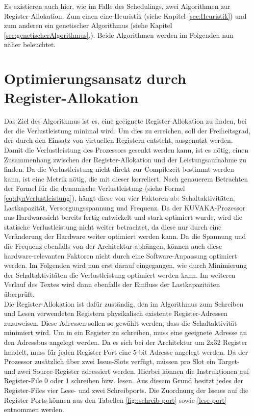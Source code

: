 \begin{itemize}
		Es existieren auch hier, wie im Falle des Schedulings, zwei Algorithmen zur Register-Allokation. Zum einen eine Heuristik (siehe Kapitel \ref{sec:Heuristik}) und zum anderen ein genetischer Algorithmus (siehe Kapitel \ref{sec:genetischerAlgorithmus}.). Beide Algorithmen werden im Folgenden nun näher beleuchtet.
\end{itemize}


\section{Optimierungsansatz durch Register-Allokation}
\label{chap:ansatz}
Das Ziel des Algorithmus ist es, eine geeignete Register-Allokation zu finden, bei der die Verlustleistung minimal wird. Um dies zu erreichen, soll der Freiheitsgrad, der durch den Einsatz von virtuellen Registern entsteht, ausgenutzt werden.
Damit die Verlustleistung des Prozessors gesenkt werden kann, ist es nötig, einen Zusammenhang zwischen der Register-Allokation und der Leistungsaufnahme zu finden. Da die Verlustleistung nicht direkt zur Compilezeit bestimmt werden kann, ist eine Metrik nötig, die mit dieser korreliert.
Nach genauerem Betrachten der Formel für die dynamische Verlustleistung (siehe Formel \ref{eq:dynVerlustleistung}), hängt diese von vier Faktoren ab: Schaltaktivitäten,  Lastkapazität, Versorgungsspannung und Frequenz. Da der KUVAKA-Prozessor aus Hardwaresicht bereits fertig entwickelt und stark optimiert wurde, wird die statische Verlustleistung nicht weiter betrachtet, da diese  nur durch eine Veränderung der Hardware weiter optimiert werden kann. Da die Spannung und die Frequenz ebenfalls von der Architektur abhängen, können auch diese hardware-relevanten Faktoren nicht durch eine Software-Anpassung optimiert werden. Im Folgenden wird nun erst darauf eingegangen, wie durch Minimierung der Schaltaktivitäten die Verlustleistung optimiert werden kann. Im weiteren Verlauf des Textes wird dann ebenfalls der Einfluss der Lastkapazitäten überprüft.\\
Die Register-Allokation ist dafür zuständig, den im Algorithmus zum Schreiben und Lesen verwendeten Registern physikalisch existente Register-Adressen zuzuweisen. Diese Adressen sollen so gewählt werden, dass die Schaltaktivität minimiert wird.
Um in ein Register zu schreiben, muss eine geeignete Adresse an den Adressbus angelegt werden. Da es sich bei der Architektur um 2x32 Register handelt, muss für jeden Register-Port eine 5-bit Adresse angelegt werden.
Da der Prozessor zusätzlich über zwei Issue-Slots verfügt, müssen pro Slot ein Target- und zwei Source-Register adressiert werden. Hierbei können die Instruktionen auf Register-File 0 oder 1 schreiben bzw. lesen. Aus diesem Grund besitzt jedes der Register-Files vier Lese- und zwei Schreibports. Die Zuordnung der Issues auf die Register-Ports können aus den Tabellen \ref{fig::schreib-port} sowie \ref{lese-port} entnommen werden.\\
